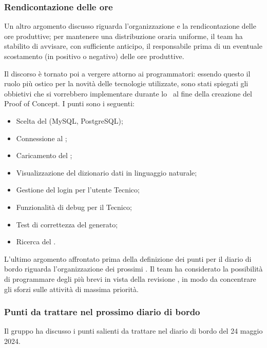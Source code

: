 \subsubsection{Rendicontazione delle ore}
\par Un altro argomento discusso riguarda l'organizzazione e la rendicontazione delle ore produttive; per mantenere una distribuzione oraria uniforme, il team ha stabilito di avvisare, con sufficiente anticipo, il responsabile prima di un eventuale scostamento (in positivo o negativo) delle ore produttive.
\par Il discorso è tornato poi a vergere attorno ai programmatori: essendo questo il ruolo più ostico per la novità delle tecnologie utilizzate, sono stati spiegati gli obbietivi che si vorrebbero implementare durante lo \ al fine della creazione del Proof of Concept. I punti sono i seguenti:
\begin{itemize}
	\item Scelta del  (MySQL, PostgreSQL);
	\item Connessione al ;
	\item Caricamento del ;
	\item Visualizzazione del dizionario dati in linguaggio naturale;
	\item Gestione del login per l'utente Tecnico; 
	\item Funzionalità di debug per il Tecnico;
	\item Test di correttezza del  generato;
	\item Ricerca del .
\end{itemize}
\par L'ultimo argomento affrontato prima della definizione dei punti per il diario di bordo riguarda l'organizzazione dei prossimi . Il team ha considerato la possibilità di programmare degli  più brevi in vista della revisione , in modo da concentrare gli sforzi sulle attività di massima priorità.

\subsubsection{Punti da trattare nel prossimo diario di bordo}
\par Il gruppo ha discusso i punti salienti da trattare nel diario di bordo del 24 maggio 2024.
